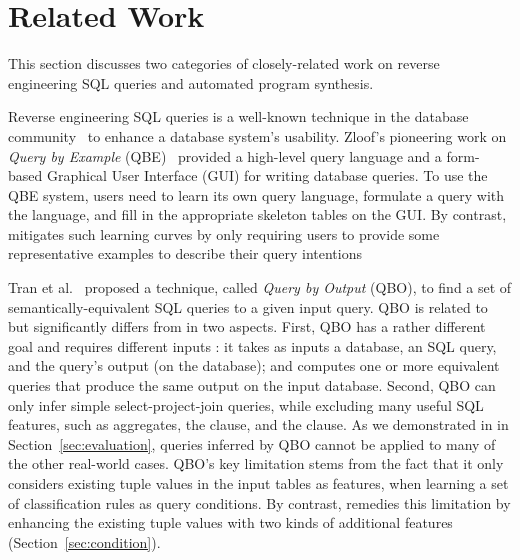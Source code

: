 
\section{Related Work}
\label{sec:related}

This section discusses two categories
of closely-related work on reverse engineering SQL queries 
and automated program synthesis.



\vspace{1mm}
Reverse engineering SQL queries is a well-known technique in the database
community~\cite{Zloof:1975, Tran:2009, DasSarma:2010} to
enhance a database system's usability. 
Zloof's pioneering work on \textit{Query by Example} (QBE)~\cite{Zloof:1975}
provided a high-level query language and a
form-based Graphical User Interface (GUI) for
writing database queries. To use the QBE system, 
users need to learn its own query language,
formulate a query with the language, and fill in
the appropriate skeleton tables on the GUI.
By contrast, \ourtool mitigates such learning curves
by only requiring users to provide some representative
examples to describe their query intentions




Tran et al.~\cite{Tran:2009} proposed a technique,
called \textit{Query by Output} (QBO), 
to find a set of semantically-equivalent SQL queries
to a given input query. QBO is related to but
significantly differs from \ourtool in two aspects.
First, QBO has a rather different goal and requires
different inputs : it takes as inputs a database,
an SQL query, and the query's output (on the database); and computes
one or more equivalent queries that produce the
same output on the input database.
Second, QBO can only infer simple select-project-join queries,
while excluding many useful SQL features, such as aggregates,
the  clause, and the 
clause. As we demonstrated in in Section~\ref{sec:evaluation},
 queries inferred by QBO cannot be applied to many of the other
real-world cases.
QBO's key limitation stems from the fact that it
only considers existing tuple values
in the input tables as features, when learning
a set of classification rules as query conditions. 
By contrast, \ourtool remedies this limitation by enhancing
the existing tuple values with two kinds of
additional features (Section~\ref{sec:condition}).


